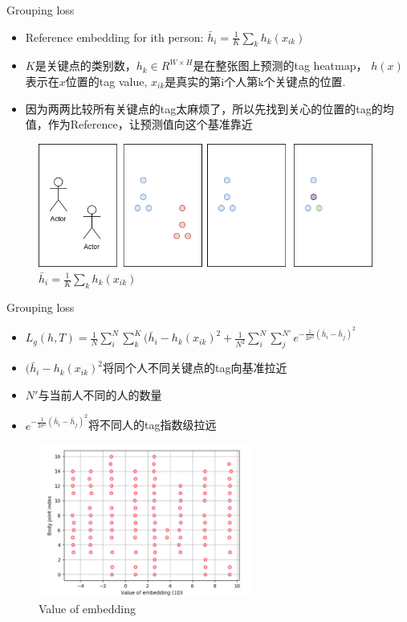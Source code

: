 \documentclass{ctexbeamer}
\begin{document}
    \begin{frame}{Grouping loss}
      \begin{itemize}
          \item Reference embedding for ith person: $\bar{h}_i=\frac{1}{K}\sum_kh_k(x_{ik})$
          \item $K$是关键点的类别数，$h_k\in R^{W\times H}$是在整张图上预测的tag heatmap， $h(x)$表示在$x$位置的tag value, $x_{ik}$是真实的第i个人第k个关键点的位置. 
          \item 因为两两比较所有关键点的tag太麻烦了，所以先找到关心的位置的tag的均值，作为Reference，让预测值向这个基准靠近
          
      \end{itemize}
      \begin{figure}
        \includegraphics[width=11cm]{fig/hxik.png}
      \caption{\label{fig:hxik} $\bar{h}_i=\frac{1}{K}\sum_kh_k(x_{ik})$}
        \end{figure}
    \vskip 1cm
    \end{frame}
    \begin{frame}{Grouping loss}
      \begin{itemize}
          \item $L_g(h,T)=\frac{1}{N}\sum_i^N\sum_k^K(\bar{h}_i-h_k(x_{ik})^2+\frac{1}{N^2}\sum_i^N\sum_j^{N'}e^{-\frac{1}{2\sigma^2}(\bar{h}_i-\bar{h}_{j})^2}$
          \item $(\bar{h}_i-h_k(x_{ik})^2$将同个人不同关键点的tag向基准拉近
          \item $N'$与当前人不同的人的数量
          \item $e^{-\frac{1}{2\sigma^2}(\bar{h}_i-\bar{h}_{j})^2}$将不同人的tag指数级拉远
      \end{itemize}
      \begin{figure}
        \includegraphics[width=7cm]{fig/value_of_emb.png}
      \caption{\label{fig:value_of_emb} Value of embedding}
        \end{figure}
    \vskip 1cm
    \end{frame}
\end{document}
